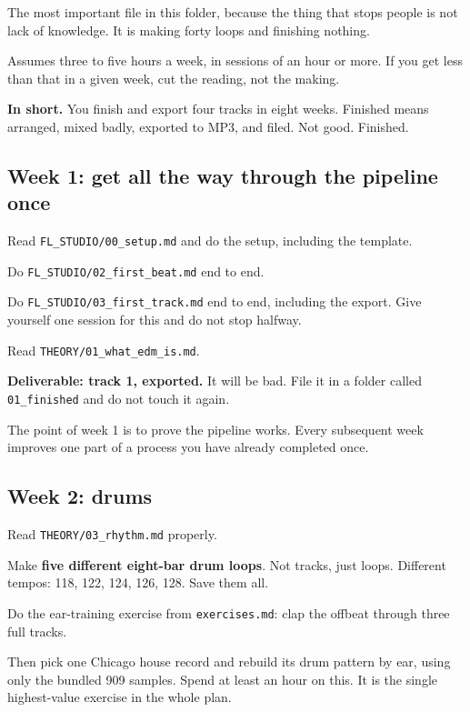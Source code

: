The most important file in this folder, because the thing that stops people is not lack of
knowledge. It is making forty loops and finishing nothing.

Assumes three to five hours a week, in sessions of an hour or more. If you get less than
that in a given week, cut the reading, not the making.

\begin{reviewbox}
\textbf{In short.} You finish and export four tracks in eight weeks. Finished means arranged,
mixed badly, exported to MP3, and filed. Not good. Finished.
\end{reviewbox}

\subsection{Week 1: get all the way through the pipeline once}\label{pr01_eight_weeks-week-1-get-all-the-way-through-the-pipeline-once}

Read \texttt{FL\_STUDIO/00\_setup.md} and do the setup, including the template.

Do \texttt{FL\_STUDIO/02\_first\_beat.md} end to end.

Do \texttt{FL\_STUDIO/03\_first\_track.md} end to end, including the export. Give yourself one
session for this and do not stop halfway.

Read \texttt{THEORY/01\_what\_edm\_is.md}.

\textbf{Deliverable: track 1, exported.} It will be bad. File it in a folder called \texttt{01\_finished}
and do not touch it again.

The point of week 1 is to prove the pipeline works. Every subsequent week improves one part
of a process you have already completed once.

\subsection{Week 2: drums}\label{pr01_eight_weeks-week-2-drums}

Read \texttt{THEORY/03\_rhythm.md} properly.

Make \textbf{five different eight-bar drum loops}. Not tracks, just loops. Different tempos:
118, 122, 124, 126, 128. Save them all.

Do the ear-training exercise from \texttt{exercises.md}: clap the offbeat through three full tracks.

Then pick one Chicago house record and rebuild its drum pattern by ear, using only the
bundled 909 samples. Spend at least an hour on this. It is the single highest-value exercise
in the whole plan.

